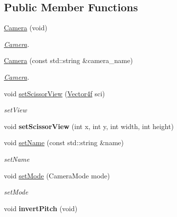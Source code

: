 \subsection*{Public Member Functions}
\begin{DoxyCompactItemize}
\item 
\hyperlink{classEngine_1_1Camera_a5c68f1ee8348320a6c47419ae2d724fb}{Camera} (void)
\begin{DoxyCompactList}\small\item\em \hyperlink{classEngine_1_1Camera}{Camera}. \end{DoxyCompactList}\item 
\hyperlink{classEngine_1_1Camera_afdc243ad39091e737778367b9925091d}{Camera} (const std\+::string \&camera\+\_\+name)
\begin{DoxyCompactList}\small\item\em \hyperlink{classEngine_1_1Camera}{Camera}. \end{DoxyCompactList}\item 
void \hyperlink{classEngine_1_1Camera_a1d5813e53c9c0eac322b079c211eb7a8}{set\+Scissor\+View} (\hyperlink{classVector4}{Vector4f} sci)
\begin{DoxyCompactList}\small\item\em set\+View \end{DoxyCompactList}\item 
\hypertarget{classEngine_1_1Camera_a863693ca42f6a9e5f0d1983af4c55b04}{}void {\bfseries set\+Scissor\+View} (int x, int y, int width, int height)\label{classEngine_1_1Camera_a863693ca42f6a9e5f0d1983af4c55b04}

\item 
void \hyperlink{classEngine_1_1Camera_a6af03781efc6da99e021a5165634627f}{set\+Name} (const std\+::string \&name)
\begin{DoxyCompactList}\small\item\em set\+Name \end{DoxyCompactList}\item 
void \hyperlink{classEngine_1_1Camera_a2de0f59bf133c8c242423a5812399166}{set\+Mode} (Camera\+Mode mode)
\begin{DoxyCompactList}\small\item\em set\+Mode \end{DoxyCompactList}\item 
\hypertarget{classEngine_1_1Camera_a83c9aa8c07f1b67b179e0708cfe427a6}{}void {\bfseries invert\+Pitch} (void)\label{classEngine_1_1Camera_a83c9aa8c07f1b67b179e0708cfe427a6}


\end{DoxyCompactItemize}
